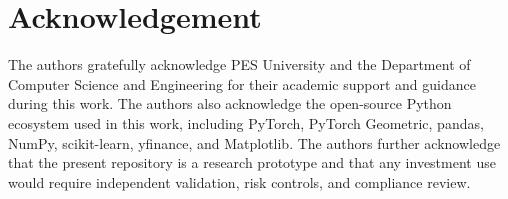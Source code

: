 \documentclass[conference]{IEEEtran}
\begin{document}
\section*{Acknowledgement}
The authors gratefully acknowledge PES University and the Department of Computer Science and Engineering for their academic support and guidance during this work. The authors also acknowledge the open-source Python ecosystem used in this work, including PyTorch, PyTorch Geometric, pandas, NumPy, scikit-learn, yfinance, and Matplotlib. The authors further acknowledge that the present repository is a research prototype and that any investment use would require independent validation, risk controls, and compliance review.



\end{document}
